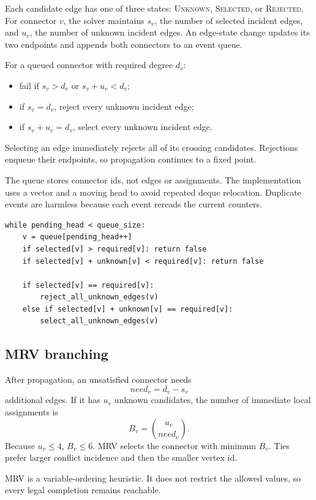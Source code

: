 \documentclass[11pt,a4paper,oneside]{article}
\begin{document}
Each candidate edge has one of three states: \textsc{Unknown},
\textsc{Selected}, or \textsc{Rejected}. For connector $v$, the solver maintains
$s_v$, the number of selected incident edges, and $u_v$, the number of unknown
incident edges. An edge-state change updates its two endpoints and appends both
connectors to an event queue.

For a queued connector with required degree $d_v$:
\begin{itemize}
  \item fail if $s_v>d_v$ or $s_v+u_v<d_v$;
  \item if $s_v=d_v$, reject every unknown incident edge;
  \item if $s_v+u_v=d_v$, select every unknown incident edge.
\end{itemize}
Selecting an edge immediately rejects all of its crossing candidates. Rejections
enqueue their endpoints, so propagation continues to a fixed point.

The queue stores connector ids, not edges or assignments. The implementation
uses a vector and a moving head to avoid repeated deque relocation. Duplicate
events are harmless because each event rereads the current counters.

\begin{lstlisting}[caption={Forced propagation at one connector}]
while pending_head < queue_size:
    v = queue[pending_head++]
    if selected[v] > required[v]: return false
    if selected[v] + unknown[v] < required[v]: return false

    if selected[v] == required[v]:
        reject_all_unknown_edges(v)
    else if selected[v] + unknown[v] == required[v]:
        select_all_unknown_edges(v)
\end{lstlisting}

\subsection{MRV branching}

After propagation, an unsatisfied connector needs
\[
  \mathit{need}_v=d_v-s_v
\]
additional edges. If it has $u_v$ unknown candidates, the number of immediate
local assignments is
\[
  B_v=\binom{u_v}{\mathit{need}_v}.
\]
Because $u_v\le4$, $B_v\le6$. MRV selects the connector with minimum $B_v$.
Ties prefer larger conflict incidence and then the smaller vertex id.

MRV is a variable-ordering heuristic. It does not restrict the allowed values,
so every legal completion remains reachable.
\end{document}
